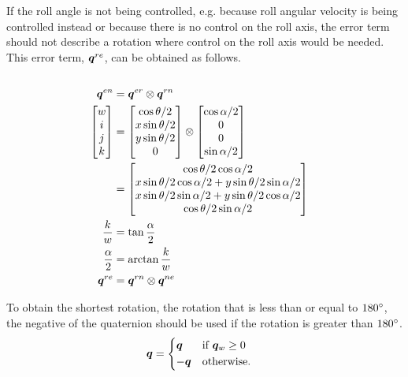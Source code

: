 If the roll angle is not being controlled, e.g. because roll angular velocity is being controlled instead or because there is no control on the roll axis, the error term should not describe a rotation where control on the roll axis would be needed.
This error term, $\bm q^{re}$, can be obtained as follows.
\begin{align}
     \\
    \bm q^{en} &= \bm q^{er} \otimes \bm q^{rn} \\
    \begin{bmatrix}
        w \\
        i \\
        j \\
        k
    \end{bmatrix} &= \begin{bmatrix}
        \cos \theta / 2 \\
        x \sin \theta / 2 \\
        y \sin \theta / 2 \\
        0
    \end{bmatrix} \otimes
    \begin{bmatrix}
        \cos \alpha / 2 \\
        0 \\
        0 \\
        \sin \alpha / 2
    \end{bmatrix} \\
    &= \begin{bmatrix}
        \cos \theta / 2 \cos \alpha / 2 \\
        x \sin \theta / 2 \cos \alpha / 2 + y \sin \theta / 2 \sin \alpha / 2 \\
        x \sin \theta / 2 \sin \alpha / 2 + y \sin \theta / 2 \cos \alpha / 2 \\
        \cos \theta / 2 \sin \alpha / 2 \\
    \end{bmatrix} \\
    \frac{k}{w} &= \tan \frac{\alpha}{2}\\
    \frac{\alpha}{2} &= \arctan \frac{k}{w} \\
    \bm q^{re} &= \bm q^{rn} \otimes \bm q^{ne}
\end{align}

To obtain the shortest rotation, the rotation that is less than or equal to $180\degree$, the negative of the quaternion should be used if the rotation is greater than $180\degree$.
\begin{align}
    \bm q &= 
    \begin{dcases}
       \bm q  & \text{if } \bm q_w \geq 0 \\
       -\bm q & \text{otherwise.}
    \end{dcases}
\end{align}


